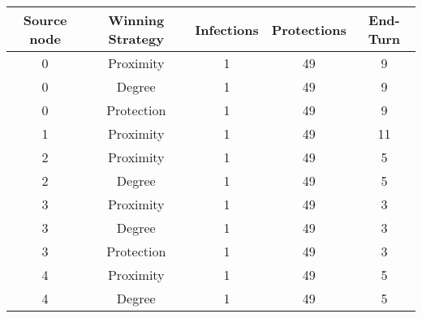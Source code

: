 \documentclass[results.tex]{subfiles}
\begin{document}
    \begin{center}
        \begin{tabular}{| c || c | c | c | c |}
            \hline
            {\bfseries Source node} & {\bfseries Winning Strategy} & {\bfseries Infections} & {\bfseries Protections}
            & {\bfseries End-Turn}
            \\  %
            \hline\hline
            0                       & Proximity                    & 1                      & 49                      & 9                    \\
            \hline
            0                       & Degree                       & 1                      & 49                      & 9                    \\
            \hline
            0                       & Protection                   & 1                      & 49                      & 9                    \\
            \hline
            1                       & Proximity                    & 1                      & 49                      & 11                   \\
            \hline
            2                       & Proximity                    & 1                      & 49                      & 5                    \\
            \hline
            2                       & Degree                       & 1                      & 49                      & 5                    \\
            \hline
            3                       & Proximity                    & 1                      & 49                      & 3                    \\
            \hline
            3                       & Degree                       & 1                      & 49                      & 3                    \\
            \hline
            3                       & Protection                   & 1                      & 49                      & 3                    \\
            \hline
            4                       & Proximity                    & 1                      & 49                      & 5                    \\
            \hline
            4                       & Degree                       & 1                      & 49                      & 5                    \\

\end{tabular}
\end{center}
\end{document}
